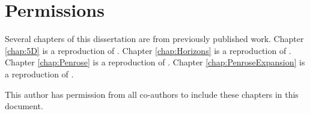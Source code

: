 \chapter{Permissions}

Several chapters of this dissertation are from previously published work. Chapter \ref{chap:5D} is a reproduction
of \cite{Chawla:2022ogv}. Chapter \ref{chap:Horizons} is a reproduction of \cite{Chawla:2023bsu}. Chapter
\ref{chap:Penrose} is a reproduction of \cite{Chawla:2024mse}. Chapter \ref{chap:PenroseExpansion} is a
reproduction of \cite{Chawla:2025uwu}.

This author has permission from all co-authors to include these chapters in
this document.
